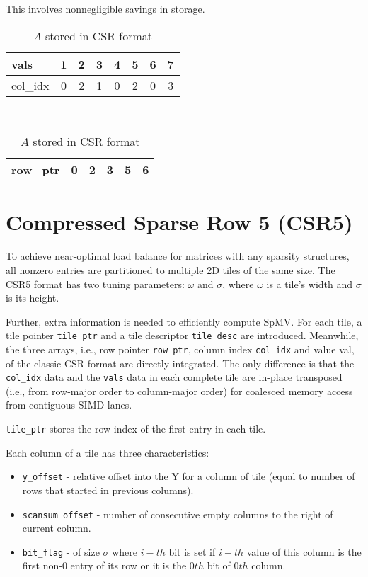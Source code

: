 \documentclass[thesis=M,english]{FITthesis}[2019/12/23]
\begin{document}
This involves nonnegligible savings in storage.

\begin{table}[h!]
	\centering
	\begin{tabular}{ |l||c|c|c|c|c|c|c| }
		\hline
		vals     & 1 & 2 & 3 & 4 & 5 & 6 & 7 \\
		\hline
		col\_idx & 0 & 2 & 1 & 0 & 2 & 0 & 3 \\
		\hline
	\end{tabular} \\
	\begin{tabular}{ |l||c|c|c|c|c| }
		\hline
		row\_ptr & 0 & 2 & 3 & 5 & 6 \\
		\hline
	\end{tabular}
	\caption{$A$ stored in CSR format}
\end{table}

\section{Compressed Sparse Row 5 (CSR5)}

\newcommand{\csre}[1]{\lstinline!#1!}

To achieve near-optimal load balance for matrices with any sparsity structures,
all nonzero entries are partitioned to multiple 2D tiles of the same size.
The CSR5 format has two tuning parameters: $\omega$ and $\sigma$, where $\omega$
is a tile’s width and $\sigma$ is its height. \cite{liu2015csr5}

Further, extra information is needed to efficiently compute
SpMV. For each tile, a tile pointer \csre{tile_ptr} and a tile descriptor \csre{tile_desc} are introduced.
Meanwhile, the three arrays, i.e., row pointer \csre{row_ptr}, column index \csre{col_idx} and value val,
of the classic CSR format are directly integrated. The only difference is that the \csre{col_idx} data and the \csre{vals}
data in each complete tile are in-place transposed (i.e., from row-major order to column-major order) for coalesced memory access from contiguous SIMD lanes.

\csre{tile_ptr} stores the row index of the first entry in each tile.

Each column of a tile has three characteristics:
\begin{itemize}
	\item \csre{y_offset} - relative offset into the Y for a column of tile (equal to number of rows that started in previous columns).
	\item \csre{scansum_offset} - number of consecutive empty columns to the right of current column.
	\item \csre{bit_flag} - of size $\sigma$ where $i-th$ bit is set if $i-th$ value of this column is the first non-0 entry of its row
	      or it is the $0th$ bit of $0th$ column.
\end{itemize}
\end{document}
